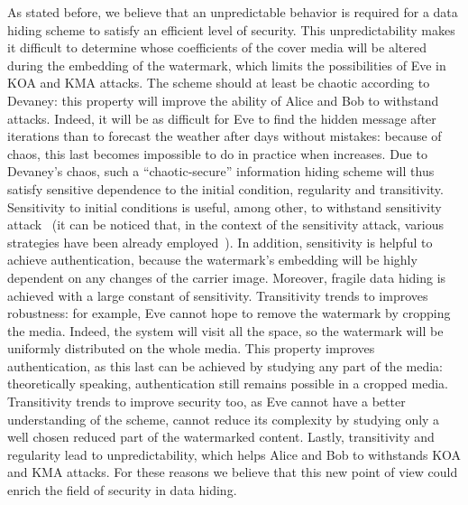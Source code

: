 \documentclass{llncs}
\begin{document}
As stated before, we believe that an unpredictable behavior is required for a data hiding scheme to satisfy an efficient level of security. This unpredictability makes it difficult to determine whose coefficients of the cover media will be altered during the embedding of the watermark, which limits the possibilities of Eve in KOA and KMA attacks. The scheme should at least be chaotic according to Devaney: this property will improve the ability of Alice and Bob to withstand attacks. Indeed, it will be as difficult for Eve to find the hidden message after  iterations than to forecast the weather after  days without mistakes: because of chaos, this last becomes impossible to do in practice when  increases. Due to Devaney's chaos, such a ``chaotic-secure'' information hiding scheme will thus satisfy sensitive dependence to the initial condition, regularity and transitivity. Sensitivity to initial conditions is useful, among other, to withstand sensitivity attack~\cite{ComesanaPP05} (it can be noticed that, in the context of the sensitivity attack, various strategies have been already employed~\cite{Furon08}). In addition, sensitivity is helpful to achieve authentication, because the watermark's embedding will be highly dependent on any changes of the carrier image. Moreover, fragile data hiding is achieved with a large constant of sensitivity. 
Transitivity trends to improves robustness: for example, Eve cannot hope to remove the watermark by cropping the media. Indeed, the system will visit all the space, so the watermark will be uniformly distributed on the whole media. This property improves authentication, as this last can be achieved by studying any part of the media: theoretically speaking, authentication still remains possible in a cropped media. Transitivity trends to improve security too, as Eve cannot have a better understanding of the scheme, cannot reduce its complexity by studying only a well chosen reduced part of the watermarked content. 
Lastly, transitivity and regularity lead to unpredictability, which helps Alice and Bob to withstands KOA and KMA attacks.
For these reasons we believe that this new point of view could enrich the field of security in data hiding.

\medskip
\end{document}
